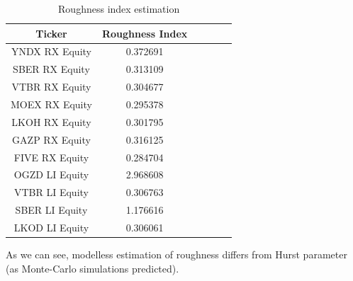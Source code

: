     \begin{table}[h]
        \centering
        \begin{tabular}{|c|c|c|c|c|c|}
            \hline
            Ticker &  Roughness Index\\\hline
            \hline
            YNDX RX Equity & 0.372691\\\hline
            SBER RX Equity & 0.313109\\\hline
            VTBR RX Equity & 0.304677\\\hline
            MOEX RX Equity & 0.295378\\\hline
            LKOH RX Equity & 0.301795\\\hline
            GAZP RX Equity & 0.316125\\\hline
            FIVE RX Equity & 0.284704\\\hline
            \hline
            OGZD LI Equity & 2.968608\\\hline
            VTBR LI Equity & 0.306763\\\hline
            SBER LI Equity & 1.176616\\\hline
            LKOD LI Equity & 0.306061\\\hline
        \end{tabular}
        \caption{Roughness index estimation}
        \label{tab:roughness_index}
    \end{table}

    As we can see, modelless estimation of roughness differs from Hurst parameter (as Monte-Carlo simulations predicted).
